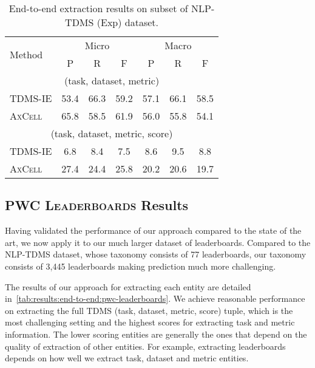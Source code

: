 \documentclass[11pt,a4paper]{article}
\newcommand{\model}{\textsc{AxCell}}
\newcommand{\leaderboards}{\textsc{PWC Leaderboards}}
\begin{document}
\label{sec:experiments:nlptdms}
\begin{table}[t]
    \centering
    \setlength{\tabcolsep}{4pt}
    \caption{End-to-end extraction results on subset of NLP-TDMS (Exp) dataset.}
    \label{tab:results:end-to-end:nlp-tdms}
    \small
    \begin{tabular}{lcccccc}
     \toprule
  \multirow{2}{*}{Method} & \multicolumn{3}{c}{Micro} & \multicolumn{3}{c}{Macro}\\
  \cmidrule(lr){2-4}\cmidrule(lr){5-7}
   & P & R & F & P & R & F\\\midrule
   \multicolumn{7}{c}{(task, dataset, metric)}\\\midrule
TDMS-IE  & 53.4 & 66.3 & 59.2 & 57.1 & 66.1 & 58.5\\
\model{} & 65.8 & 58.5 & 61.9 & 56.0 & 55.8 & 54.1\\
\midrule
  \multicolumn{7}{c}{(task, dataset, metric, score)}\\\midrule
TDMS-IE  & 6.8 & 8.4 & 7.5 & 8.6 & 9.5 & 8.8\\
\model{} & 27.4 & 24.4 & 25.8 & 20.2 & 20.6 & 19.7\\
     \bottomrule
    \end{tabular}
\end{table}


\subsection{\leaderboards{} Results}
Having validated the performance of our approach compared to the state of the art, we now apply it to our much larger dataset of leaderboards. Compared to the NLP-TDMS dataset, whose taxonomy consists of 77 leaderboards, our taxonomy consists of 3,445 leaderboards making prediction much more challenging. 

The results of our approach for extracting each entity are detailed in~\cref{tab:results:end-to-end:pwc-leaderboards}. We achieve reasonable performance on extracting the full TDMS (task, dataset, metric, score) tuple, which is the most challenging setting and the highest scores for extracting task and metric information. The lower scoring entities are generally the ones that depend on the quality of extraction of other entities. For example, extracting leaderboards depends on how well we extract task, dataset and metric entities.
\end{document}
